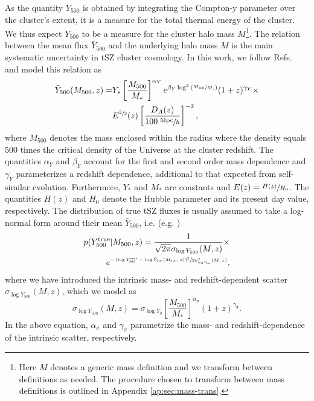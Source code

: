 \documentclass[%
 reprint,
nofootinbib,
 amsmath,amssymb,
 aps,
]{revtex4-1}
\begin{document}
As the quantity $Y_{500}$ is obtained by integrating the Compton-y parameter over the cluster's extent, it is a measure for the total thermal energy of the cluster. We thus expect $Y_{500}$ to be a measure for the cluster halo mass $M$\footnote{Here $M$ denotes a generic mass definition and we transform between definitions as needed. The procedure chosen to transform between mass definitions is outlined in Appendix \ref{ap:sec:mass-trans}.}. The relation between the mean flux $\bar{Y}_{500}$ and the underlying halo mass $M$ is the main systematic uncertainty in tSZ cluster cosmology. In this work, we follow Refs.~\cite{Planck:2014XX, Alonso:2016, Madhavacheril:2017} and model this relation as 
\begin{equation}
\begin{aligned}
\bar{Y}_{500}(M_{500}, z) = & Y_{*}\left[\frac{M_{500}}{M_{*}}\right]^{\alpha_{Y}} e^{\beta_{Y}\log^{2}{\left(\sfrac{M_{500}}{M_{*}}\right)}}(1+z)^{\gamma_{Y}} \times \\ &E^{\sfrac{2}{3}}(z)\left[\frac{D_{A}(z)}{100 \; \sfrac{\mathrm{Mpc}}{h}}\right]^{-2},
\end{aligned}
\label{eq:Y-M-mean}
\end{equation}
where $M_{500}$ denotes the mass enclosed within the radius where the density equals 500 times the critical density of the Universe at the cluster redshift. The quantities $\alpha_{Y}$ and $\beta_{Y}$ account for the first and second order mass dependence and $\gamma_{Y}$ parameterizes a redshift dependence, additional to that expected from self-similar evolution. Furthermore, $Y_{*}$ and $M_{*}$ are constants and $E(z) = \sfrac{H(z)}{H_{0}}$. The quantities $H(z)$ and $H_{0}$ denote the Hubble parameter and its present day value, respectively. The distribution of true tSZ fluxes is usually assumed to take a log-normal form around their mean $\bar{Y}_{500}$, i.e. (e.g. \cite{Alonso:2016})
\begin{equation}
\begin{aligned}
p(Y_{500}^{\mathrm{true}}|M_{500}, z) = \frac{1}{\sqrt{2\pi}\sigma_{\log Y_{500}}(M, z)} \times \\e^{-\sfrac{(\log{Y_{500}^{\mathrm{true}}}-\log{\bar{Y}_{500}(M_{500}, z)})^{2}}{2\sigma^{2}_{\log Y_{500}}(M, z)}},
\end{aligned}
\end{equation} 
where we have introduced the intrinsic mass- and redshift-dependent scatter $\sigma_{\log Y_{500}}(M, z)$, which we model as \cite{Madhavacheril:2017}
\begin{equation}
\sigma_{\log Y_{500}}(M, z) = \sigma_{\log Y_{0}}\left[\frac{M_{500}}{M_{*}}\right]^{\alpha_{\sigma}}(1+z)^{\gamma_{\sigma}}.
\label{eq:Y-M-scatter}
\end{equation}
In the above equation, $\alpha_{\sigma}$ and $\gamma_{\sigma}$ parametrize the mass- and redshift-dependence of the intrinsic scatter, respectively.
\end{document}
